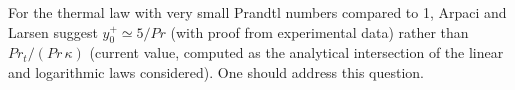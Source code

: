 

For the thermal law with very small Prandtl numbers compared to 1, 
Arpaci and Larsen suggest $y_0^+ \simeq 5/Pr$ (with proof from 
experimental data) rather than $Pr_t/(Pr\,\kappa)$  (current value, 
computed as the analytical intersection of the linear and logarithmic
laws considered). One should address this question.


